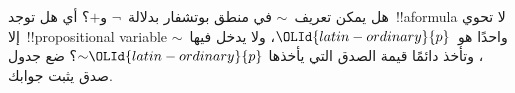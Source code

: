 \documentclass[../../../include/open-logic-section]{subfiles}
\begin{document}
\begin{prob}
  هل يمكن تعريف~$\sim$ في منطق بوتشفار بدلالة~$\lnot$ و$+$؟ أي هل
  توجد~!!a{formula} لا تحوي إلا~!!{propositional variable} واحدًا
  هو~${\OLId{latin-ordinary}{p}}$، ولا يدخل فيها~$\sim$، وتأخذ دائمًا قيمة الصدق التي يأخذها
  $\mathord{\sim}{\OLId{latin-ordinary}{p}}$؟ ضع جدول صدق يثبت جوابك.
\end{prob}
\end{document}
